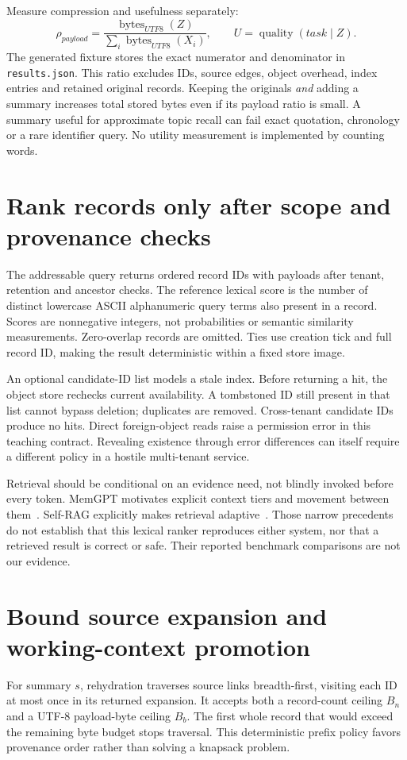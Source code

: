 Measure compression and usefulness separately:
\[
 \rho_{payload}=\frac{\operatorname{bytes}_{UTF8}(Z)}
 {\sum_i\operatorname{bytes}_{UTF8}(X_i)},\qquad
 U=\operatorname{quality}(task\mid Z).
\]
The generated fixture stores the exact numerator and denominator in
\texttt{results.json}. This ratio excludes IDs, source edges, object overhead,
index entries and retained original records. Keeping the originals \emph{and}
adding a summary increases total stored bytes even if its payload ratio is
small. A summary useful for approximate topic recall can fail exact quotation,
chronology or a rare identifier query. No utility measurement is implemented
by counting words.

\section{Rank records only after scope and provenance checks}
\label{evod40:retrieval}
The addressable query returns ordered record IDs with payloads after tenant,
retention and ancestor checks. The reference lexical score is the number of
distinct lowercase ASCII alphanumeric query terms also present in a record.
Scores are nonnegative integers, not probabilities or semantic similarity
measurements. Zero-overlap records are omitted. Ties use creation tick and
full record ID, making the result deterministic within a fixed store image.

An optional candidate-ID list models a stale index. Before returning a hit,
the object store rechecks current availability. A tombstoned ID still present
in that list cannot bypass deletion; duplicates are removed. Cross-tenant
candidate IDs produce no hits. Direct foreign-object reads raise a permission
error in this teaching contract. Revealing existence through error differences
can itself require a different policy in a hostile multi-tenant service.

Retrieval should be conditional on an evidence need, not blindly invoked
before every token. MemGPT motivates explicit context tiers and movement
between them~\cite{evod40:memgpt}. Self-RAG explicitly makes retrieval
adaptive~\cite{evod40:selfrag}. Those narrow precedents do not establish that
this lexical ranker reproduces either system, nor that a retrieved result is
correct or safe. Their reported benchmark comparisons are not our evidence.

\section{Bound source expansion and working-context promotion}
\label{evod40:rehydrate}
For summary $s$, rehydration traverses source links breadth-first, visiting
each ID at most once in its returned expansion. It accepts both a record-count
ceiling $B_n$ and a UTF-8 payload-byte ceiling $B_b$. The first whole record
that would exceed the remaining byte budget stops traversal. This deterministic
prefix policy favors provenance order rather than solving a knapsack problem.

